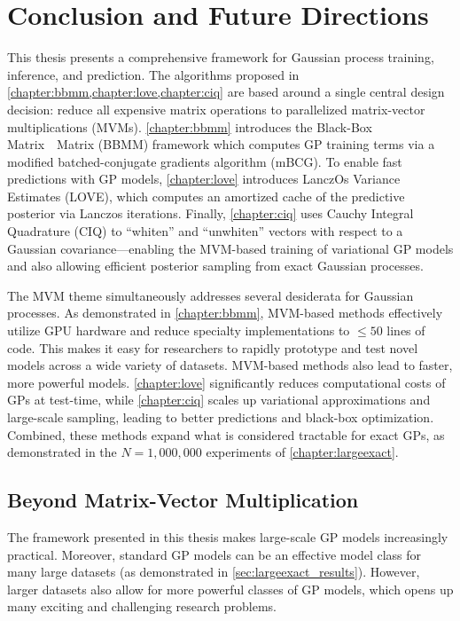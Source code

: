 \chapter{Conclusion and Future Directions}
\label{chapter:discussion}


This thesis presents a comprehensive framework for Gaussian process training, inference, and prediction.
The algorithms proposed in \cref{chapter:bbmm,chapter:love,chapter:ciq} are based around a single central design decision: reduce all expensive matrix operations to parallelized matrix-vector multiplications (MVMs).
\cref{chapter:bbmm} introduces the Black-Box Matrix~\texttimes~Matrix (BBMM) framework which computes GP training terms via a modified batched-conjugate gradients algorithm (mBCG).
To enable fast predictions with GP models, \cref{chapter:love} introduces LanczOs Variance Estimates (LOVE), which computes an amortized cache of the predictive posterior via Lanczos iterations.
Finally, \cref{chapter:ciq} uses Cauchy Integral Quadrature (CIQ) to ``whiten'' and ``unwhiten'' vectors with respect to a Gaussian covariance---enabling
the MVM-based training of variational GP models and also allowing efficient posterior sampling from exact Gaussian processes.

The MVM theme simultaneously addresses several desiderata for Gaussian processes.
As demonstrated in \cref{chapter:bbmm}, MVM-based methods effectively utilize GPU hardware and reduce specialty implementations to $\leq 50$ lines of code.
This makes it easy for researchers to rapidly prototype and test novel models across a wide variety of datasets.
MVM-based methods also lead to faster, more powerful models.
\cref{chapter:love} significantly reduces computational costs of GPs at test-time, while
\cref{chapter:ciq} scales up variational approximations and large-scale sampling, leading to better predictions and black-box optimization.
Combined, these methods expand what is considered tractable for exact GPs, as demonstrated in the $N=1,\!000,\!000$ experiments of \cref{chapter:largeexact}.
\clearpage



\section{Beyond Matrix-Vector Multiplication}

The framework presented in this thesis makes large-scale GP models increasingly practical.
Moreover, standard GP models can be an effective model class for many large datasets (as demonstrated in \cref{sec:largeexact_results}).
However, larger datasets also allow for more powerful classes of GP models, which opens up many exciting and challenging research problems.

